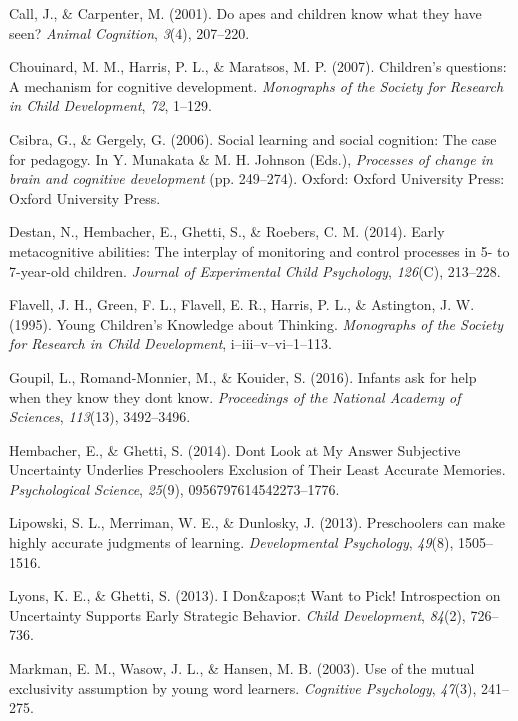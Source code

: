 \documentclass[10pt, letterpaper]{article}
\begin{document}
\hypertarget{ref-Call2001}{}
Call, J., \& Carpenter, M. (2001). Do apes and children know what they
have seen? \emph{Animal Cognition}, \emph{3}(4), 207--220.

\hypertarget{ref-Chouinard2007}{}
Chouinard, M. M., Harris, P. L., \& Maratsos, M. P. (2007). Children's
questions: A mechanism for cognitive development. \emph{Monographs of
the Society for Research in Child Development}, \emph{72}, 1--129.

\hypertarget{ref-Csibra2006}{}
Csibra, G., \& Gergely, G. (2006). Social learning and social cognition:
The case for pedagogy. In Y. Munakata \& M. H. Johnson (Eds.),
\emph{Processes of change in brain and cognitive development} (pp.
249--274). Oxford: Oxford University Press: Oxford University Press.

\hypertarget{ref-Destan2014}{}
Destan, N., Hembacher, E., Ghetti, S., \& Roebers, C. M. (2014). Early
metacognitive abilities: The interplay of monitoring and control
processes in 5- to 7-year-old children. \emph{Journal of Experimental
Child Psychology}, \emph{126}(C), 213--228.

\hypertarget{ref-Flavell1995}{}
Flavell, J. H., Green, F. L., Flavell, E. R., Harris, P. L., \&
Astington, J. W. (1995). Young Children's Knowledge about Thinking.
\emph{Monographs of the Society for Research in Child Development},
i--iii--v--vi--1--113.

\hypertarget{ref-Goupil2016}{}
Goupil, L., Romand-Monnier, M., \& Kouider, S. (2016). Infants ask for
help when they know they dont know. \emph{Proceedings of the National
Academy of Sciences}, \emph{113}(13), 3492--3496.

\hypertarget{ref-Hembacher2014}{}
Hembacher, E., \& Ghetti, S. (2014). Dont Look at My Answer Subjective
Uncertainty Underlies Preschoolers Exclusion of Their Least Accurate
Memories. \emph{Psychological Science}, \emph{25}(9),
0956797614542273--1776.

\hypertarget{ref-Lipowski2013}{}
Lipowski, S. L., Merriman, W. E., \& Dunlosky, J. (2013). Preschoolers
can make highly accurate judgments of learning. \emph{Developmental
Psychology}, \emph{49}(8), 1505--1516.

\hypertarget{ref-Lyons2013}{}
Lyons, K. E., \& Ghetti, S. (2013). I Don\&apos;t Want to Pick!
Introspection on Uncertainty Supports Early Strategic Behavior.
\emph{Child Development}, \emph{84}(2), 726--736.

\hypertarget{ref-Markman2003}{}
Markman, E. M., Wasow, J. L., \& Hansen, M. B. (2003). Use of the mutual
exclusivity assumption by young word learners. \emph{Cognitive
Psychology}, \emph{47}(3), 241--275.
\end{document}
